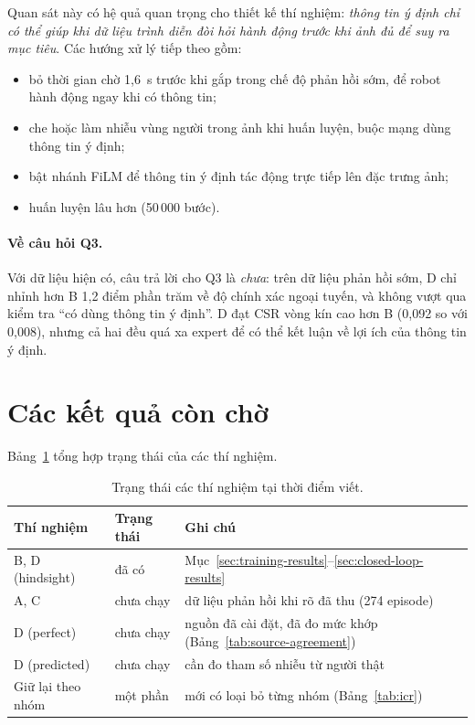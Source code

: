 Quan sát này có hệ quả quan trọng cho thiết kế thí nghiệm: \emph{thông tin ý định chỉ có thể giúp khi dữ liệu trình diễn đòi hỏi hành động trước khi ảnh đủ để suy ra mục tiêu}. Các hướng xử lý tiếp theo gồm:
\begin{itemize}
  \item bỏ thời gian chờ 1,6~s trước khi gắp trong chế độ phản hồi sớm, để robot hành động ngay khi có thông tin;
  \item che hoặc làm nhiễu vùng người trong ảnh khi huấn luyện, buộc mạng dùng thông tin ý định;
  \item bật nhánh FiLM để thông tin ý định tác động trực tiếp lên đặc trưng ảnh;
  \item huấn luyện lâu hơn (50\,000 bước).
\end{itemize}

\paragraph{Về câu hỏi Q3.} Với dữ liệu hiện có, câu trả lời cho Q3 là \emph{chưa}: trên dữ liệu phản hồi sớm, D chỉ nhỉnh hơn B 1,2 điểm phần trăm về độ chính xác ngoại tuyến, và không vượt qua kiểm tra ``có dùng thông tin ý định''. D đạt CSR vòng kín cao hơn B (0,092 so với 0,008), nhưng cả hai đều quá xa expert để có thể kết luận về lợi ích của thông tin ý định.

\section{Các kết quả còn chờ}
\label{sec:results-status}

Bảng~\ref{tab:pending} tổng hợp trạng thái của các thí nghiệm.

\begin{table}[htbp]
  \centering
  \caption{Trạng thái các thí nghiệm tại thời điểm viết.}
  \label{tab:pending}
  \small
  \begin{tabularx}{\textwidth}{@{}l l X@{}}
    \toprule
    \textbf{Thí nghiệm} & \textbf{Trạng thái} & \textbf{Ghi chú} \\
    \midrule
    B, D (hindsight)   & đã có & Mục~\ref{sec:training-results}--\ref{sec:closed-loop-results} \\
    A, C               & chưa chạy & dữ liệu phản hồi khi rõ đã thu (274 episode) \\
    D (perfect)        & chưa chạy & nguồn đã cài đặt, đã đo mức khớp (Bảng~\ref{tab:source-agreement}) \\
    D (predicted)      & chưa chạy & cần đo tham số nhiễu từ người thật \\
    Giữ lại theo nhóm  & một phần & mới có loại bỏ từng nhóm (Bảng~\ref{tab:icr}) \\
    \bottomrule
  \end{tabularx}
\end{table}

